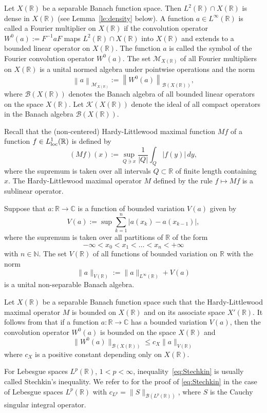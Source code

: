 \documentclass[reqno]{amsproc}
\newcommand{\cB}{\mathcal{B}}
\newcommand{\cK}{\mathcal{K}}
\newcommand{\cM}{\mathcal{M}}
\newcommand{\C}{\mathbb{C}}
\newcommand{\N}{\mathbb{N}}
\newcommand{\R}{\mathbb{R}}
\theoremstyle{definition}
\theoremstyle{remark}
\numberwithin{equation}{section}
\begin{document}
Let $X(\R)$ be a separable Banach function space. Then $L^2(\R)\cap X(\R)$
is dense in $X(\R)$ (see Lemma~\ref{le:density} below). A function 
$a\in L^\infty(\R)$ is called a Fourier multiplier on $X(\R)$ if the 
convolution operator $W^0(a):=F^{-1}aF$ maps $L^2(\R)\cap X(\R)$ into 
$X(\R)$ and extends to a bounded linear operator on $X(\R)$. The function 
$a$ is called the symbol of the Fourier convolution operator $W^0(a)$. 
The set $\cM_{X(\R)}$ of all Fourier multipliers on  $X(\R)$ is a unital 
normed algebra under pointwise operations and the norm
\[
\left\|a\right\|_{\cM_{X(\R)}}:=\left\|W^0(a)\right\|_{\cB(X(\R))},
\]
where $\cB(X(\R))$ denotes the Banach algebra of all bounded linear operators
on the space $X(\R)$. Let $\cK(X(\R))$ denote the ideal of all compact
operators in the Banach algebra $\cB(X(\R))$.

Recall that the (non-centered) Hardy-Littlewood maximal function $Mf$ of a
function $f\in L_{\rm loc}^1(\R)$ is defined by
\[
(Mf)(x):=\sup_{Q\ni x}\frac{1}{|Q|}\int_Q|f(y)|\,dy,
\]
where the supremum is taken over all intervals $Q\subset\R$ of finite length
containing $x$. The Hardy-Littlewood maximal operator $M$ defined by the rule 
$f\mapsto Mf$ is a sublinear operator.

Suppose that $a:\R\to\C$ is a function of bounded variation $V(a)$ given 
by
\[
V(a):=\sup \sum_{k=1}^n |a(x_k)-a(x_{k-1})|,
\]
where the supremum is taken over all partitions of $\R$ of the form
\[
-\infty<x_0<x_1<\dots<x_n<+\infty
\]
with $n\in\N$. The set $V(\R)$ of all functions of bounded variation
on $\R$ with the norm
\[
\|a\|_{V(\R)}:=\|a\|_{L^\infty(\R)}+V(a)
\]
is a unital non-separable Banach algebra.

Let $X(\R)$ be a separable Banach function space such that the
Hardy-Littlewood maximal operator $M$ is bounded on $X(\R)$ and on its
associate space $X'(\R)$. It follows from \cite[Theorem~4.3]{K15a}
that if a function $a:\R\to\C$ has a bounded variation $V(a)$, then 
the convolution operator $W^0(a)$ is bounded on the space $X(\R)$ and
\begin{equation}\label{eq:Stechkin}
\|W^0(a)\|_{\cB(X(\R))}
\le
c_{X}\|a\|_{V(\R)}
\end{equation}
where $c_{X}$ is a positive constant depending only on $X(\R)$.

For Lebesgue spaces $L^p(\R)$, $1<p<\infty$, inequality~\eqref{eq:Stechkin} is
usually called Stechkin's inequality.
We refer to \cite[Theorem~2.11]{D79} for the proof of \eqref{eq:Stechkin}
in the case of Lebesgue spaces $L^p(\R)$ with $c_{L^p}=\|S\|_{\cB(L^p(\R))}$,
where $S$ is the Cauchy singular integral operator.
\end{document}
